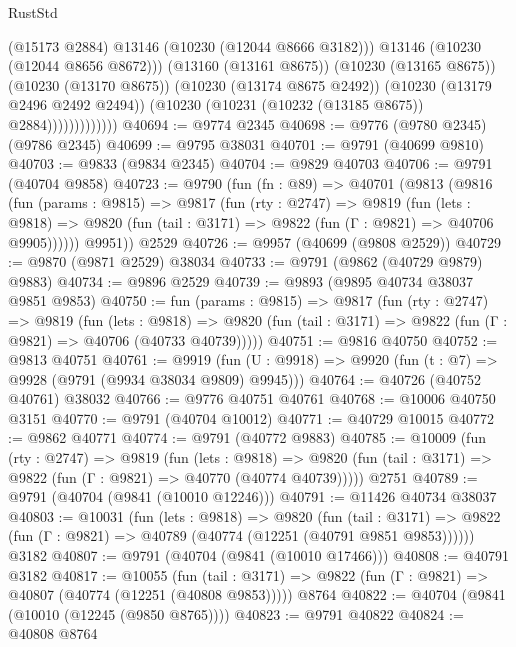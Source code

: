 \begin{lexlean}{RustStd}
\begin{coremodule}
                              (@15173 @2884)
                              @13146
                              (@10230 (@12044 @8666 @3182)))
                            @13146
                            (@10230 (@12044 @8656 @8672)))
                          (@13160 (@13161 @8675))
                          (@10230 (@13165 @8675))
                          (@10230 (@13170 @8675))
                          (@10230 (@13174 @8675 @2492))
                          (@10230 (@13179 @2496 @2492 @2494))
                          (@10230 (@10231 (@10232 (@13185 @8675)) @2884)))))))))))))
@40694 := @9774 @2345
@40698 := @9776 (@9780 @2345) (@9786 @2345)
@40699 := @9795 @38031
@40701 := @9791 (@40699 @9810)
@40703 := @9833 (@9834 @2345)
@40704 := @9829 @40703
@40706 := @9791 (@40704 @9858)
@40723 := @9790
    (fun (fn : @89) =>
    @40701
      (@9813
        (@9816
          (fun (params : @9815) =>
          @9817
            (fun (rty : @2747) =>
            @9819
              (fun (lets : @9818) =>
              @9820 (fun (tail : @3171) => @9822 (fun (Γ : @9821) => @40706 @9905))))))
        @9951))
    @2529
@40726 := @9957 (@40699 (@9808 @2529))
@40729 := @9870 (@9871 @2529) @38034
@40733 := @9791 (@9862 (@40729 @9879) @9883)
@40734 := @9896 @2529
@40739 := @9893 (@9895 @40734 @38037 @9851 @9853)
@40750 := fun (params : @9815) =>
  @9817
    (fun (rty : @2747) =>
    @9819
      (fun (lets : @9818) =>
      @9820 (fun (tail : @3171) => @9822 (fun (Γ : @9821) => @40706 (@40733 @40739)))))
@40751 := @9816 @40750
@40752 := @9813 @40751
@40761 := @9919
    (fun (U : @9918) => @9920 (fun (t : @7) => @9928 (@9791 (@9934 @38034 @9809) @9945)))
@40764 := @40726 (@40752 @40761) @38032
@40766 := @9776 @40751 @40761
@40768 := @10006 @40750 @3151
@40770 := @9791 (@40704 @10012)
@40771 := @40729 @10015
@40772 := @9862 @40771
@40774 := @9791 (@40772 @9883)
@40785 := @10009
    (fun (rty : @2747) =>
    @9819
      (fun (lets : @9818) =>
      @9820 (fun (tail : @3171) => @9822 (fun (Γ : @9821) => @40770 (@40774 @40739)))))
    @2751
@40789 := @9791 (@40704 (@9841 (@10010 @12246)))
@40791 := @11426 @40734 @38037
@40803 := @10031
    (fun (lets : @9818) =>
    @9820
      (fun (tail : @3171) =>
      @9822 (fun (Γ : @9821) => @40789 (@40774 (@12251 (@40791 @9851 @9853))))))
    @3182
@40807 := @9791 (@40704 (@9841 (@10010 @17466)))
@40808 := @40791 @3182
@40817 := @10055
    (fun (tail : @3171) => @9822 (fun (Γ : @9821) => @40807 (@40774 (@12251 (@40808 @9853)))))
    @8764
@40822 := @40704 (@9841 (@10010 (@12245 (@9850 @8765))))
@40823 := @9791 @40822
@40824 := @40808 @8764

\end{coremodule}
\end{lexlean}
